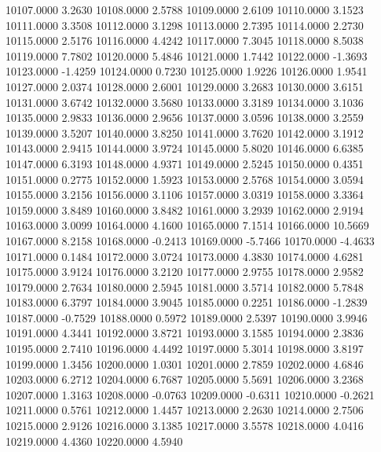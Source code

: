 10107.0000      3.2630
10108.0000      2.5788
10109.0000      2.6109
10110.0000      3.1523
10111.0000      3.3508
10112.0000      3.1298
10113.0000      2.7395
10114.0000      2.2730
10115.0000      2.5176
10116.0000      4.4242
10117.0000      7.3045
10118.0000      8.5038
10119.0000      7.7802
10120.0000      5.4846
10121.0000      1.7442
10122.0000     -1.3693
10123.0000     -1.4259
10124.0000      0.7230
10125.0000      1.9226
10126.0000      1.9541
10127.0000      2.0374
10128.0000      2.6001
10129.0000      3.2683
10130.0000      3.6151
10131.0000      3.6742
10132.0000      3.5680
10133.0000      3.3189
10134.0000      3.1036
10135.0000      2.9833
10136.0000      2.9656
10137.0000      3.0596
10138.0000      3.2559
10139.0000      3.5207
10140.0000      3.8250
10141.0000      3.7620
10142.0000      3.1912
10143.0000      2.9415
10144.0000      3.9724
10145.0000      5.8020
10146.0000      6.6385
10147.0000      6.3193
10148.0000      4.9371
10149.0000      2.5245
10150.0000      0.4351
10151.0000      0.2775
10152.0000      1.5923
10153.0000      2.5768
10154.0000      3.0594
10155.0000      3.2156
10156.0000      3.1106
10157.0000      3.0319
10158.0000      3.3364
10159.0000      3.8489
10160.0000      3.8482
10161.0000      3.2939
10162.0000      2.9194
10163.0000      3.0099
10164.0000      4.1600
10165.0000      7.1514
10166.0000     10.5669
10167.0000      8.2158
10168.0000     -0.2413
10169.0000     -5.7466
10170.0000     -4.4633
10171.0000      0.1484
10172.0000      3.0724
10173.0000      4.3830
10174.0000      4.6281
10175.0000      3.9124
10176.0000      3.2120
10177.0000      2.9755
10178.0000      2.9582
10179.0000      2.7634
10180.0000      2.5945
10181.0000      3.5714
10182.0000      5.7848
10183.0000      6.3797
10184.0000      3.9045
10185.0000      0.2251
10186.0000     -1.2839
10187.0000     -0.7529
10188.0000      0.5972
10189.0000      2.5397
10190.0000      3.9946
10191.0000      4.3441
10192.0000      3.8721
10193.0000      3.1585
10194.0000      2.3836
10195.0000      2.7410
10196.0000      4.4492
10197.0000      5.3014
10198.0000      3.8197
10199.0000      1.3456
10200.0000      1.0301
10201.0000      2.7859
10202.0000      4.6846
10203.0000      6.2712
10204.0000      6.7687
10205.0000      5.5691
10206.0000      3.2368
10207.0000      1.3163
10208.0000     -0.0763
10209.0000     -0.6311
10210.0000     -0.2621
10211.0000      0.5761
10212.0000      1.4457
10213.0000      2.2630
10214.0000      2.7506
10215.0000      2.9126
10216.0000      3.1385
10217.0000      3.5578
10218.0000      4.0416
10219.0000      4.4360
10220.0000      4.5940
